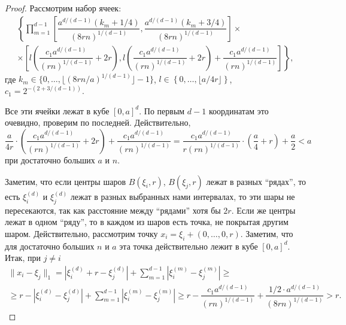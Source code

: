 \documentclass[12pt]{article}
\theoremstyle{plain}
\theoremstyle{definition}
\theoremstyle{remark}
\def\geq{\geqslant}
\begin{document}
\begin{proof}
    Рассмотрим набор ячеек: 
    \begin{multline*}
        \left\{\prod\limits_{m=1}^{d-1}\left[\dfrac{a^{d/(d-1)}(k_m+1/4)}{(8rn)^{1/(d-1)}}, \dfrac{a^{d/(d-1)}(k_m+3/4)}{(8rn)^{1/(d-1)}}\right]\right.
    \times \\
    \times \left.\left[l\left(\dfrac{c_1a^{d/(d-1)}}{(rn)^{1/(d-1)}} +2r\right) ,  l\left(\dfrac{c_1a^{d/(d-1)}}{(rn)^{1/(d-1)}}+2r\right) + \dfrac{c_1a^{d/(d-1)}}{(rn)^{1/(d-1)}}  \right]\right\},
    \end{multline*}{}
    где $k_m \in \{0, \ldots, \lfloor (8rn/a)^{1/(d-1)}\rfloor-1\}$, $l\in \left\{0, \ldots, \lfloor a/4r\rfloor\right\}$, $c_1 = 2^{-(2+3/(d-1))}$. 
    
    Все эти ячейки лежат в кубе $[0,a]^d$. По первым $d-1$ координатам это очевидно, проверим по последней. Действительно, 
    \begin{equation*}
        \dfrac{a}{4r}\cdot\left(\dfrac{c_1a^{d/(d-1)}}{(rn)^{1/(d-1)}}+2r\right) + \dfrac{c_1a^{d/(d-1)}}{(rn)^{1/(d-1)}} %
        = \dfrac{c_1a^{d/(d-1)}}{r(rn)^{1/(d-1)}}\cdot\left(\dfrac{a}{4} + r\right) + \dfrac{a}{2}
        < a
    \end{equation*}{}
    при достаточно больших $a$ и $n$.
    
    Заметим, что если центры шаров $B(\xi_i, r)$, $B(\xi_j, r)$ лежат в разных ``рядах'', то есть $\xi_i^{(d)}$ и $\xi_j^{(d)}$ лежат в разных выбранных нами интервалах, то эти шары не пересекаются, так как расстояние между ``рядами'' хотя бы $2r$. Если же центры лежат в одном ``ряду'', то в каждом из шаров есть точка, не покрытая другим шаром. Действительно, рассмотрим точку  $x_i = \xi_i + (0, \ldots, 0, r)$. Заметим, что для достаточно больших $n$ и $a$ эта точка действительно лежит в кубе $[0, a]^d$. Итак, при $j \not= i$
    \begin{multline*}
        \|x_i - \xi_j\|_1 = 
        |\xi_i^{(d)} + r - \xi_j^{(d)} | + \sum_{m=1}^{d-1}|\xi_i^{(m)} - \xi_j^{(m)}| \geq\\
        \geq r - |\xi_i^{(d)} - \xi_j^{(d)} | + \sum_{m=1}^{d-1}|\xi_i^{(m)} - \xi_j^{(m)}| \geq
        r - \dfrac{c_1a^{d/(d-1)}}{(rn)^{1/(d-1)}} + \dfrac{1/2\cdot a^{d/(d-1)}}{(8rn)^{1/(d-1)}} > r.
    \end{multline*}{}
    

\end{proof}
\end{document}
